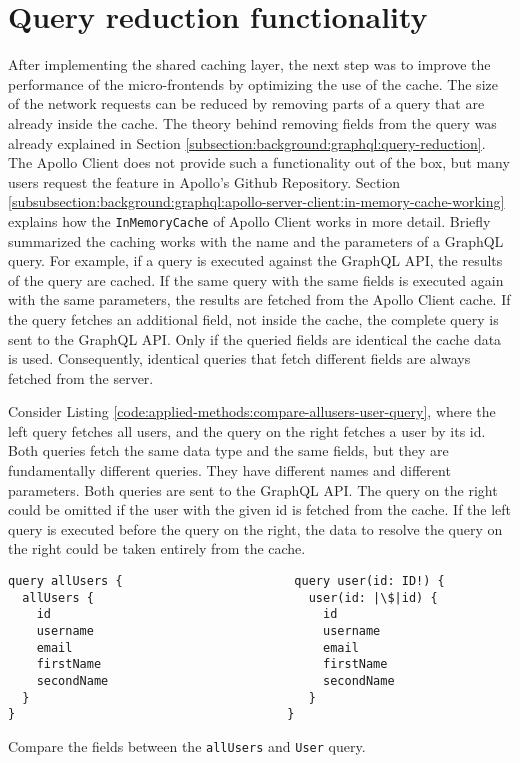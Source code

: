 \section{Query reduction functionality}\label{section:applied-methods:query-reduction}

After implementing the shared caching layer, the next step was to improve the performance of the micro-frontends by optimizing the use of the cache. The size of the network requests can be reduced by removing parts of a query that are already inside the cache. The theory behind removing fields from the query was already explained in Section \ref{subsection:background:graphql:query-reduction}. The Apollo Client does not provide such a functionality out of the box, but many users request the feature in Apollo's Github Repository. Section \ref{subsubsection:background:graphql:apollo-server-client:in-memory-cache-working} explains how the \texttt{InMemoryCache} of Apollo Client works in more detail. Briefly summarized the caching works with the name and the parameters of a GraphQL query. For example, if a query is executed against the GraphQL \ac{API}, the results of the query are cached. If the same query with the same fields is executed again with the same parameters, the results are fetched from the Apollo Client cache. If the query fetches an additional field, not inside the cache, the complete query is sent to the GraphQL \ac{API}. Only if the queried fields are identical the cache data is used. Consequently, identical queries that fetch different fields are always fetched from the server.

\bigskip

\noindent Consider Listing \ref{code:applied-methods:compare-allusers-user-query}, where the left query fetches all users, and the query on the right fetches a user by its id. Both queries fetch the same data type and the same fields, but they are fundamentally different queries. They have different names and different parameters. Both queries are sent to the GraphQL \ac{API}. The query on the right could be omitted if the user with the given id is fetched from the cache. If the left query is executed before the query on the right, the data to resolve the query on the right could be taken entirely from the cache.

\ifshowListings
\begin{listing}[H]
  \begin{verbatim}
query allUsers {                        query user(id: ID!) {
  allUsers {                              user(id: |\$|id) {
    id                                      id
    username                                username
    email                                   email
    firstName                               firstName
    secondName                              secondName
  }                                       }
}                                      }
  \end{verbatim}
  \caption{Compare the fields between the \texttt{allUsers} and \texttt{User} query.}\label{code:applied-methods:compare-allusers-user-query}
\end{listing}
\fi

